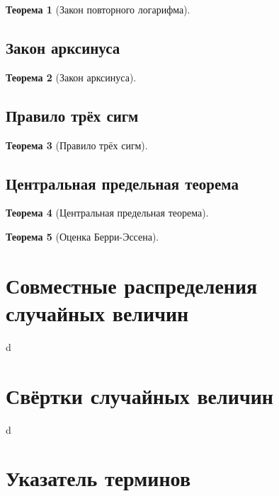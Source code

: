\documentclass[12pt]{article}
\newtheorem{theorem}{Теорема}
\numberwithin{theorem}{section}
\theoremstyle{definition}
\begin{document}
	\begin{theorem}[Закон повторного логарифма]
		
	\end{theorem}
	
	\subsection{Закон арксинуса}
	
	\begin{theorem}[Закон арксинуса]
		
	\end{theorem}
	
	\subsection{Правило трёх сигм}
	
	\begin{theorem}[Правило трёх сигм]
		
	\end{theorem}
	
	\subsection{Центральная предельная теорема}
	
	\begin{theorem}[Центральная предельная теорема]
		
	\end{theorem}
	
	\begin{theorem}[Оценка Берри-Эссена]
		
	\end{theorem}
	
	\section{Совместные распределения случайных величин}
	
	d
	
	\section{Свёртки случайных величин}
	
	d
	
	\section{Указатель терминов}
	
\end{document}
